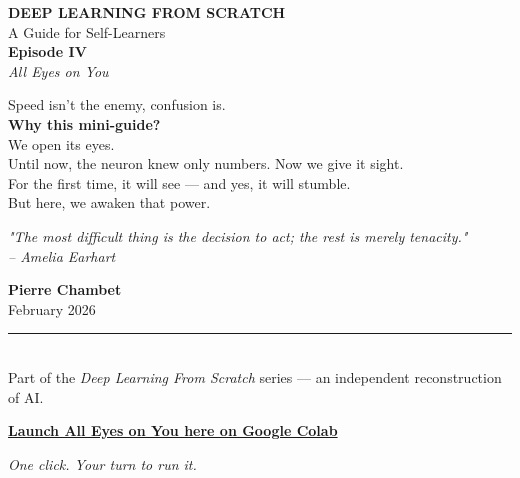 \documentclass[11pt]{article}
\begin{document}
\begin{titlepage}
    \centering
    \vspace*{2.2cm}

    {\Large \textbf{DEEP LEARNING FROM SCRATCH}}\\[0.4em]
    A Guide for Self-Learners\\[2.5em]

    {\Huge \bfseries Episode IV}\\[0.4em]
    {\LARGE \textit{All Eyes on You}}\\[2em]

    \vspace{2cm}

   \begin{tcolorbox}[colback=black!3!white, colframe=black!20!white, width=0.8\textwidth, sharp corners, boxrule=0.4pt]
    \centering
    \itshape

    {\Large Speed isn't the enemy, confusion is.}\\[1em]

    \textbf{Why this mini-guide?}\\[0.3em]
    We open its eyes.\\
    Until now, the neuron knew only numbers. Now we give it sight.\\
    For the first time, it will see — and yes, it will stumble.\\
    But here, we awaken that power.
    \end{tcolorbox}
    \vspace{1.5cm}
    \begin{center}
    \itshape
        {\Large \textit{"The most difficult thing is the decision to act; the rest is merely tenacity."}}\\
        \vspace{0.2em}
        {\large -- Amelia Earhart}
    \end{center}


    \vfill

    {\large \textbf{Pierre Chambet}}\\[0.3em]
    {\small February 2026}\\[1em]
    \rule{0.8\textwidth}{0.4pt}\\[0.4em]
    {\small Part of the \textit{Deep Learning From Scratch} series — an independent reconstruction of AI.}

\end{titlepage}


\begin{tcolorbox}[colback=white, colframe=black!80, boxrule=0.8pt,
  width=\textwidth, before skip=10pt, after skip=10pt, halign=center,
  fontupper=\sffamily\large]

\href{https://colab.research.google.com/github/Pchambet/Deep-Learning-from-Scratch/blob/main/notebooks/04_training_loop_from_scratch.ipynb}{
  \textbf{\large Launch All Eyes on You here on Google Colab}
}

\vspace{0.5em}

{\color{gray!80!black}\small%
\textit{One click. Your turn to run it.}
}
\end{tcolorbox}
\end{document}
